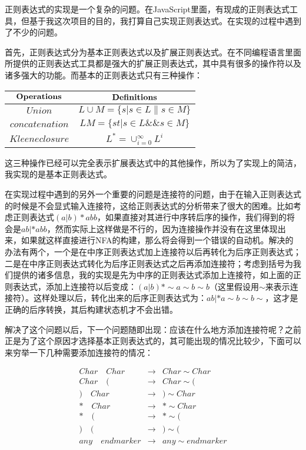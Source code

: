 正则表达式的实现是一个复杂的问题。在JavaScript里面，有现成的正则表达式工具，但基于我这次项目的目的，我打算自己实现正则表达式。在实现的过程中遇到了不少的问题。

首先，正则表达式分为基本正则表达式以及扩展正则表达式。在不同编程语言里面所提供的正则表达式工具都是强大的扩展正则表达式，其中具有很多的操作符以及诸多强大的功能。而基本的正则表达式只有三种操作：

\begin{center}\begin{tabular}{c|c}
    $\bf{Operations}$ & $\bf{Definitions}$ \\
    \hline
    $Union$          & $L \cup M = \{s|s \in L \| s \in M\}$  \\
    $concatenation$  & $LM = \{st|s \in L \&\& s \in M\}$  \\
    $Kleene closure$ & $L^* = \cup^\infty_{i=0} L^i$  \\
\end{tabular}\end{center}

这三种操作已经可以完全表示扩展表达式中的其他操作，所以为了实现上的简洁，我实现的是基本正则表达式。

在实现过程中遇到的另外一个重要的问题是连接符的问题，由于在输入正则表达式的时候是不会显式输入连接符，这给正则表达式的分析带来了很大的困难。比如考虑正则表达式$(a|b)*abb$，如果直接对其进行中序转后序的操作，我们得到的将会是$ab|*abb$，然而实际上这样做是不行的，因为连接操作并没有在这里体现出来，如果就这样直接进行NFA的构建，那么将会得到一个错误的自动机。解决的办法有两个，一个是在中序正则表达式加上连接符以后再转化为后序正则表达式；二是在中序正则表达式转化为后序正则表达式之后再添加连接符；考虑到括号为我们提供的诸多信息，我的实现是先为中序的正则表达式添加上连接符，如上面的正则表达式，添加上连接符以后变成：$(a|b)*\sim a\sim b\sim b$（这里假设用$\sim$来表示连接符）。这样处理以后，转化出来的后序正则表达式为：$ab|*a\sim b\sim b\sim$，这才是正确的后序转换，其后构建状态机才不会出错。

解决了这个问题以后，下一个问题随即出现：应该在什么地方添加连接符呢？之前正是为了这个原因才选择基本正则表达式的，其可能出现的情况比较少，下面可以来穷举一下几种需要添加连接符的情况：

\begin{eqnarray*}
    Char \quad Char & \rightarrow & Char \sim Char \\
    Char \quad (    & \rightarrow & Char \sim ( \\
    ) \quad Char    & \rightarrow & ) \sim Char \\
    * \quad Char    & \rightarrow & * \sim Char \\
    * \quad (       & \rightarrow & * \sim ( \\
    ) \quad (       & \rightarrow & ) \sim ( \\
    any \quad endmarker & \rightarrow & any \sim endmarker \\
\end{eqnarray*}

